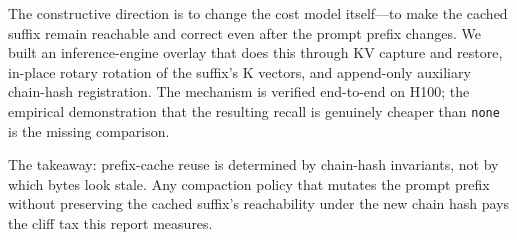\documentclass[letterpaper,twocolumn,10pt]{article}
\begin{document}
The constructive direction is to change the cost model
itself---to make the cached suffix remain reachable and correct
even after the prompt prefix changes. We built an inference-engine
overlay that does this through KV capture and restore, in-place
rotary rotation of the suffix's K vectors, and append-only
auxiliary chain-hash registration. The mechanism is verified
end-to-end on H100; the empirical demonstration that the
resulting recall is genuinely cheaper than \texttt{none} is the
missing comparison.

The takeaway: prefix-cache reuse is determined by chain-hash
invariants, not by which bytes look stale. Any compaction policy
that mutates the prompt prefix without preserving the cached
suffix's reachability under the new chain hash pays the cliff
tax this report measures.



\end{document}
